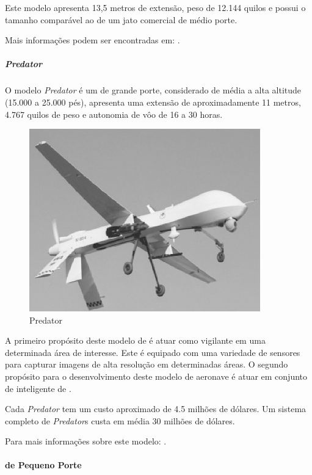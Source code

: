 Este modelo apresenta 13,5 metros de extensão, peso de 12.144 quilos e possui o tamanho comparável ao de um jato comercial de médio porte. 



Mais informações podem ser encontradas em:  \cite{Drew2005,uav_roadmap2005,Bone2003}.


\subparagraph{ \emph{Predator} }

 O modelo \emph{Predator} é um \vant  de grande porte, considerado de média a alta altitude (15.000 a 25.000 pés), apresenta 
uma extensão de aproximadamente 11 metros,  4.767 quilos de peso e autonomia de vôo de 16 a 30 horas.

\begin{figure}[h!]
\centering
\includegraphics[width=10cm]{pictures/predator.png}
\caption{Predator}
 \label{fig:predator}
\end{figure}

A primeiro propósito deste modelo de \vant é atuar como vigilante em uma determinada área de interesse. Este \vant é equipado com uma variedade de sensores para capturar imagens de alta resolução em determinadas áreas.
O segundo propósito para o desenvolvimento deste modelo de aeronave é atuar em conjunto de inteligente de \uavs. 

Cada \emph{Predator} tem um custo aproximado de 4.5 milhões de dólares. Um sistema completo de \emph{Predator}s custa em média 30 milhões de dólares.

Para mais informações sobre este modelo:  \cite{Drew2005,uav_roadmap2005,Bone2003}.



\paragraph{\vants de Pequeno Porte}

